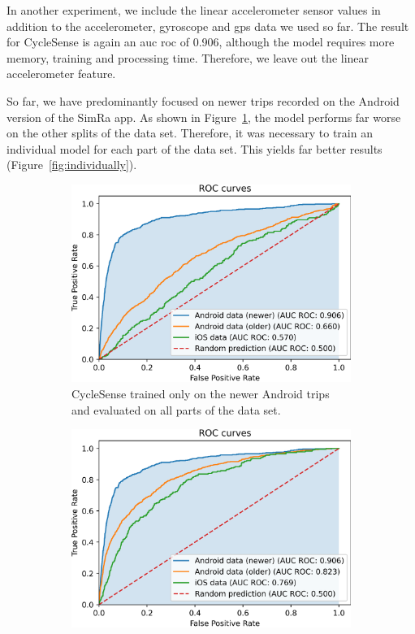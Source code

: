 In another experiment, we include the linear accelerometer sensor values in addition to the accelerometer, gyroscope and \ac{gps} data we used so far.
The result for CycleSense is again an \ac{auc} \ac{roc} of 0.906, although the model requires more memory, training and processing time.
Therefore, we leave out the linear accelerometer feature.

So far, we have predominantly focused on newer trips recorded on the Android version of the SimRa app.
As shown in Figure~\ref{fig:traindonone}, the model performs far worse on the other splits of the data set.
Therefore, it was necessary to train an individual model for each part of the data set.
This yields far better results (Figure~\ref{fig:individually}).

\begin{figure}%
	\centering
	\begin{subfigure}[b]{0.475\textwidth}
		\centering
		\includegraphics[width=\textwidth]{fig/rocauctrainedon73.png}
		\caption{\small CycleSense trained only on the newer Android trips and evaluated on all parts of the data set.}
		\label{fig:traindonone}
	\end{subfigure}
	\hfill
	\begin{subfigure}[b]{0.475\textwidth}
		\centering
		\includegraphics[width=\textwidth]{fig/rocauctrainedindividually.png}

\end{subfigure}
\end{figure}
